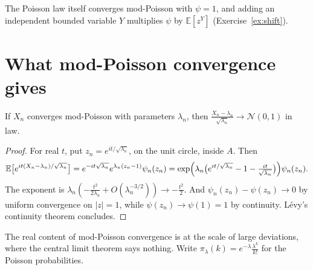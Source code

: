 The Poisson law itself converges mod-Poisson with $\psi=1$, and adding an independent bounded variable $Y$ multiplies $\psi$ by $\mathbb E[z^Y]$ (Exercise~\ref{ex:shift}).

\section{What mod-Poisson convergence gives}

\begin{theorem}\label{thm:modpoissonclt}
If $X_n$ converges mod-Poisson with parameters $\lambda_n$, then $\frac{X_n-\lambda_n}{\sqrt{\lambda_n}}\to\mathcal N(0,1)$ in law.
\end{theorem}
\begin{proof}
For real $t$, put $z_n=e^{it/\sqrt{\lambda_n}}$, on the unit circle, inside $A$. Then
\[
\mathbb E\bigl[e^{it(X_n-\lambda_n)/\sqrt{\lambda_n}}\bigr]=e^{-it\sqrt{\lambda_n}}e^{\lambda_n(z_n-1)}\psi_n(z_n)=\exp\Bigl(\lambda_n\bigl(e^{it/\sqrt{\lambda_n}}-1-\tfrac{it}{\sqrt{\lambda_n}}\bigr)\Bigr)\psi_n(z_n).
\]
The exponent is $\lambda_n(-\frac{t^2}{2\lambda_n}+O(\lambda_n^{-3/2}))\to-\frac{t^2}2$. And $\psi_n(z_n)-\psi(z_n)\to0$ by uniform convergence on $|z|=1$, while $\psi(z_n)\to\psi(1)=1$ by continuity. L\'evy's continuity theorem concludes.
\end{proof}

The real content of mod-Poisson convergence is at the scale of large deviations, where the central limit theorem says nothing. Write $\pi_\lambda(k)=e^{-\lambda}\frac{\lambda^k}{k!}$ for the Poisson probabilities.

